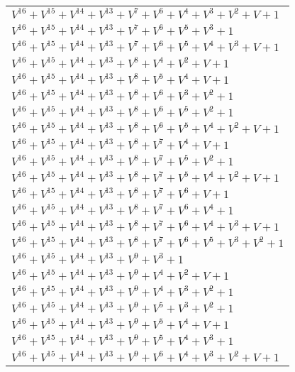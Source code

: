 \documentclass[12pt]{article}
\begin{document}
\begin{adjustwidth}{-4cm}{}
\begin{center}
\begin{longtable}{|l|}
$V^{16}  +V^{15}  +V^{14}  +V^{13}  +V^{7}  +V^{6}  +V^{4}  +V^{3}  +V^{2}  + V + 1$ \\
$V^{16}  +V^{15}  +V^{14}  +V^{13}  +V^{7}  +V^{6}  +V^{5}  +V^{3}  + 1$ \\
$V^{16}  +V^{15}  +V^{14}  +V^{13}  +V^{7}  +V^{6}  +V^{5}  +V^{4}  +V^{3}  + V + 1$ \\
$V^{16}  +V^{15}  +V^{14}  +V^{13}  +V^{8}  +V^{4}  +V^{2}  + V + 1$ \\
$V^{16}  +V^{15}  +V^{14}  +V^{13}  +V^{8}  +V^{5}  +V^{4}  + V + 1$ \\
$V^{16}  +V^{15}  +V^{14}  +V^{13}  +V^{8}  +V^{6}  +V^{3}  +V^{2}  + 1$ \\
$V^{16}  +V^{15}  +V^{14}  +V^{13}  +V^{8}  +V^{6}  +V^{5}  +V^{2}  + 1$ \\
$V^{16}  +V^{15}  +V^{14}  +V^{13}  +V^{8}  +V^{6}  +V^{5}  +V^{4}  +V^{2}  + V + 1$ \\
$V^{16}  +V^{15}  +V^{14}  +V^{13}  +V^{8}  +V^{7}  +V^{4}  + V + 1$ \\
$V^{16}  +V^{15}  +V^{14}  +V^{13}  +V^{8}  +V^{7}  +V^{5}  +V^{2}  + 1$ \\
$V^{16}  +V^{15}  +V^{14}  +V^{13}  +V^{8}  +V^{7}  +V^{5}  +V^{4}  +V^{2}  + V + 1$ \\
$V^{16}  +V^{15}  +V^{14}  +V^{13}  +V^{8}  +V^{7}  +V^{6}  + V + 1$ \\
$V^{16}  +V^{15}  +V^{14}  +V^{13}  +V^{8}  +V^{7}  +V^{6}  +V^{4}  + 1$ \\
$V^{16}  +V^{15}  +V^{14}  +V^{13}  +V^{8}  +V^{7}  +V^{6}  +V^{4}  +V^{3}  + V + 1$ \\
$V^{16}  +V^{15}  +V^{14}  +V^{13}  +V^{8}  +V^{7}  +V^{6}  +V^{5}  +V^{3}  +V^{2}  + 1$ \\
$V^{16}  +V^{15}  +V^{14}  +V^{13}  +V^{9}  +V^{3}  + 1$ \\
$V^{16}  +V^{15}  +V^{14}  +V^{13}  +V^{9}  +V^{4}  +V^{2}  + V + 1$ \\
$V^{16}  +V^{15}  +V^{14}  +V^{13}  +V^{9}  +V^{4}  +V^{3}  +V^{2}  + 1$ \\
$V^{16}  +V^{15}  +V^{14}  +V^{13}  +V^{9}  +V^{5}  +V^{3}  +V^{2}  + 1$ \\
$V^{16}  +V^{15}  +V^{14}  +V^{13}  +V^{9}  +V^{5}  +V^{4}  + V + 1$ \\
$V^{16}  +V^{15}  +V^{14}  +V^{13}  +V^{9}  +V^{5}  +V^{4}  +V^{3}  + 1$ \\
$V^{16}  +V^{15}  +V^{14}  +V^{13}  +V^{9}  +V^{6}  +V^{4}  +V^{3}  +V^{2}  + V + 1$ \\

\end{longtable}
\end{center}
\end{adjustwidth}
\end{document}
